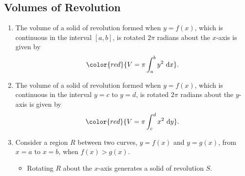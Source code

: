 \documentclass[12pt, a4paper]{article}
\def\d{{\mathrm{d}}}
\begin{document}
\subsection{Volumes of Revolution}
\begin{enumerate}
    \item The volume of a solid of revolution formed when $y=f(x)$, which is continuous in the interval $\left[a,b\right]$, is rotated $2\pi$ radians about the $x$-axis is given by 
    $${\color{red}{V=\pi\int_a^by^2\ \d x}}.$$
    \item The volume of a solid of revolution formed when $y=f(x)$, which is continuous in the interval $y=c$ to $y=d$, is rotated $2\pi$ radians about the $y$-axis is given by
    $${\color{red}{V=\pi\int_c^dx^2\ \d y}}.$$
    \item Consider a region $R$ between two curves, $y=f(x)$ and $y=g(x)$, from $x=a$ to $x=b$, when $f(x)>g(x)$.
    \begin{figure}[htbp]
        \centering
    \end{figure}
    \begin{itemize}
        \item Rotating $R$ about the $x$-axis generates a solid of revolution $S$. 

\end{itemize}
\end{enumerate}
\end{document}
